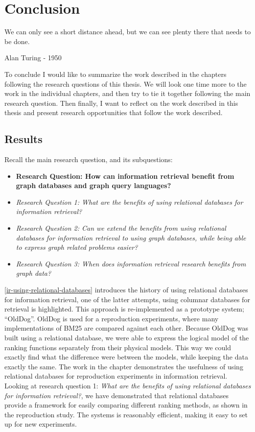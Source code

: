 \chapter{Conclusion}
\label{conclusion}
\epigraph{We can only see a short distance ahead, but we can see plenty there that needs to be done.}{Alan Turing - 1950}

To conclude I would like to summarize the work described in the chapters following the research questions of this thesis. We will look one time more to the work in the individual chapters, and then try to tie it together following the main research question. Then finally, I want to reflect on the work described in this thesis and present research opportunities that follow the work described. 

\section{Results}
Recall the main research question, and its subquestions:
\begin{itemize}
	\item \textbf{Research Question: How can information retrieval benefit from graph databases and graph query languages?}
	\item \emph{Research Question 1: What are the benefits of using relational databases for information retrieval?} 
	\item \emph{Research Question 2: Can we extend the benefits from using relational databases for information retrieval to using graph databases, while being able to express graph related problems easier?} 
	\item \emph{Research Question 3: When does information retrieval research benefits from graph data?} 
\end{itemize}

\cref{ir-using-relational-databases} introduces the history of using relational databases for information retrieval, one of the latter attempts, using columnar databases for retrieval is highlighted. This approach is re-implemented as a prototype system; ``OldDog''. OldDog is used for a reproduction experiments, where many implementations of BM25 are compared against each other. Because OldDog was built using a relational database, we were able to express the logical model of the ranking functions separately from their physical models. This way we could exactly find what the difference were between the models, while keeping the data exactly the same. The work in the chapter demonstrates the usefulness of using relational databases for reproduction experiments in information retrieval. Looking at research question 1: \emph{What are the benefits of using relational databases for information retrieval?}, we have demonstrated that relational databases provide a framework for easily comparing different ranking methods, as shown in the reproduction study. The systems is reasonably efficient, making it easy to set up for new experiments. 

